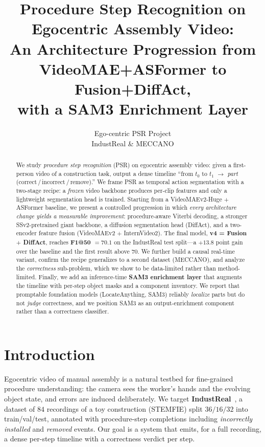 \documentclass[11pt]{article}
\title{\vspace{-1.5em}\textbf{Procedure Step Recognition on Egocentric Assembly Video:\\
An Architecture Progression from VideoMAE+ASFormer to Fusion+DiffAct,\\ with a SAM3 Enrichment Layer}}
\author{Ego-centric PSR Project \\ \small IndustReal \& MECCANO}
\date{}
\newcommand{\best}[1]{\textcolor{best}{\textbf{#1}}}
\begin{document}
\maketitle
\vspace{-2em}

\begin{abstract}
\noindent
We study \emph{procedure step recognition} (PSR) on egocentric assembly video: given a first-person
video of a construction task, output a dense timeline ``from $t_0$ to $t_1$ $\rightarrow$ \textit{part}
(correct\,/\,incorrect\,/\,remove).'' We frame PSR as temporal action segmentation with a two-stage recipe:
a \emph{frozen} video backbone produces per-clip features and only a lightweight segmentation head is trained.
Starting from a VideoMAEv2\nobreakdash-Huge $+$ ASFormer baseline, we present a controlled progression in which
\emph{every architecture change yields a measurable improvement}: procedure-aware Viterbi decoding, a stronger
SSv2\nobreakdash-pretrained giant backbone, a diffusion segmentation head (DiffAct), and a two-encoder feature
fusion (VideoMAEv2 $+$ InternVideo2). The final model, \textbf{v4 = Fusion $+$ DiffAct}, reaches
\best{F1@50 $=70.1$} on the IndustReal test split---a $+13.8$ point gain over the baseline and the first result
above $70$. We further build a causal real-time variant, confirm the recipe generalizes to a second dataset
(MECCANO), and analyze the \emph{correctness} sub-problem, which we show to be data-limited rather than
method-limited. Finally, we add an inference-time \textbf{SAM3 enrichment layer} that augments the timeline with
per-step object masks and a component inventory. We report that promptable foundation models (LocateAnything,
SAM3) reliably \emph{localize} parts but do not \emph{judge} correctness, and we position SAM3 as an output-enrichment
component rather than a correctness classifier.
\end{abstract}

\section{Introduction}
Egocentric video of manual assembly is a natural testbed for fine-grained procedure understanding: the camera
sees the worker's hands and the evolving object state, and errors are induced deliberately. We target
\textbf{IndustReal}~\cite{industreal}, a dataset of $84$ recordings of a toy construction (STEMFIE) split
$36/16/32$ into train/val/test, annotated with procedure-step completions including \emph{incorrectly installed}
and \emph{removed} events. Our goal is a system that emits, for a full recording, a dense per-step timeline with
a correctness verdict per step.
\end{document}
